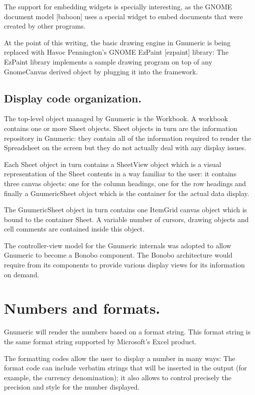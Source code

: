 \documentclass[12pt,twoside,twocolumn]{article}
\begin{document}
The support for embedding widgets is specially interesting, as the
GNOME document model [baboon] uses a special widget to embed documents
that were created by other programs. 

At the point of this writing, the basic drawing engine in Gnumeric is
being replaced with Havoc Pennington's GNOME EzPaint [ezpaint]
library: The EzPaint library implements a sample drawing program on
top of any GnomeCanvas derived object by plugging it into the
framework.  

\subsection{Display code organization.}

The top-level object managed by Gnumeric is the Workbook.  A workbook
contains one or more Sheet objects.  Sheet objects in turn are the
information repository in Gnumeric:  they contain all of the
information required to render the Spreadsheet on the screen but they
do not actually deal with any display issues. 

Each Sheet object in turn contains a SheetView object which is a
visual representation of the Sheet contents in a way familiar to the
user: it contains three canvas objects: one for the column headings,
one for the row headings and finally a GnumericSheet object which is
the container for the actual data display.

The GnumericSheet object in turn contains one ItemGrid canvas object
which is bound to the container Sheet.  A variable number of cursors,
drawing objects and cell comments are contained inside this object.

The controller-view model for the Gnumeric internals was adopted to
allow Gnumeric to become a Bonobo component.  The Bonobo architecture
would require from its components to provide various display views for
its information on demand.

\section{Numbers and formats.}

Gnumeric will render the numbers based on a format string.  This
format string is the same format string supported by Microsoft's Excel
product. 

The formatting codes allow the user to display a number in many ways:
The format code can include verbatim strings that will be inserted in
the output (for example, the currency denomination);  it also allows
to control precisely the precision and style for the number
displayed. 
\end{document}
